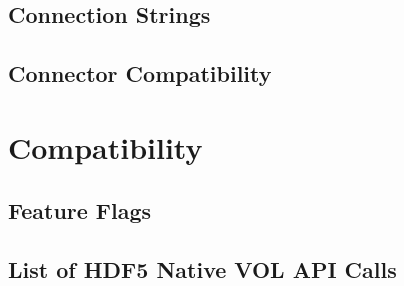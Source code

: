 \subsection{Connection Strings}
\subsection{Connector Compatibility}

\section{Compatibility}
\subsection{Feature Flags}
\subsection{List of HDF5 Native VOL API Calls}

